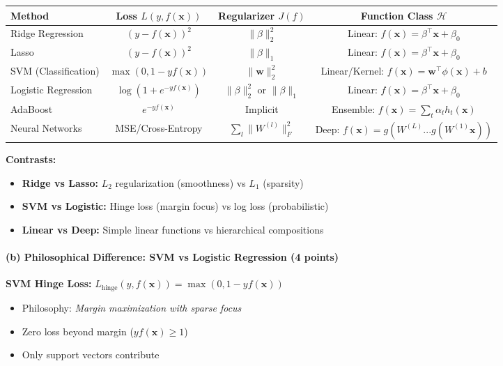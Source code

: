 \documentclass[12pt,a4paper]{article}
\theoremstyle{definition}
\begin{document}
\begin{center}
\begin{tabular}{|l|c|c|c|}
\hline
\textbf{Method} & \textbf{Loss} $L(y, f(\mathbf{x}))$ & \textbf{Regularizer} $J(f)$ & \textbf{Function Class} $\mathcal{H}$ \\
\hline
Ridge Regression & $(y - f(\mathbf{x}))^2$ & $\|\beta\|_2^2$ & Linear: $f(\mathbf{x}) = \beta^\top\mathbf{x} + \beta_0$ \\
\hline
Lasso & $(y - f(\mathbf{x}))^2$ & $\|\beta\|_1$ & Linear: $f(\mathbf{x}) = \beta^\top\mathbf{x} + \beta_0$ \\
\hline
SVM (Classification) & $\max(0, 1 - yf(\mathbf{x}))$ & $\|\mathbf{w}\|_2^2$ & Linear/Kernel: $f(\mathbf{x}) = \mathbf{w}^\top\phi(\mathbf{x}) + b$ \\
\hline
Logistic Regression & $\log(1 + e^{-yf(\mathbf{x})})$ & $\|\beta\|_2^2$ or $\|\beta\|_1$ & Linear: $f(\mathbf{x}) = \beta^\top\mathbf{x} + \beta_0$ \\
\hline
AdaBoost & $e^{-yf(\mathbf{x})}$ & Implicit & Ensemble: $f(\mathbf{x}) = \sum_t \alpha_t h_t(\mathbf{x})$ \\
\hline
Neural Networks & MSE/Cross-Entropy & $\sum_{l} \|W^{(l)}\|_F^2$ & Deep: $f(\mathbf{x}) = g(W^{(L)}...g(W^{(1)}\mathbf{x}))$ \\
\hline
\end{tabular}
\end{center}

\textbf{Contrasts:}
\begin{itemize}
\item \textbf{Ridge vs Lasso:} $L_2$ regularization (smoothness) vs $L_1$ (sparsity)
\item \textbf{SVM vs Logistic:} Hinge loss (margin focus) vs log loss (probabilistic)
\item \textbf{Linear vs Deep:} Simple linear functions vs hierarchical compositions
\end{itemize}

\paragraph{(b) Philosophical Difference: SVM vs Logistic Regression (4 points)}

\textbf{SVM Hinge Loss:} $L_{\text{hinge}}(y, f(\mathbf{x})) = \max(0, 1 - yf(\mathbf{x}))$
\begin{itemize}
\item Philosophy: \textit{Margin maximization with sparse focus}
\item Zero loss beyond margin ($yf(\mathbf{x}) \geq 1$)
\item Only support vectors contribute
\end{itemize}
\end{document}
